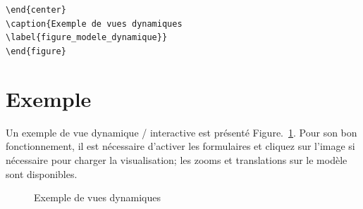 \documentclass[a4paper,12pt]{report}
\begin{document}
\verb|\end{center}   | \\
\verb|\caption{Exemple de vues dynamiques | \\
\verb|\label{figure_modele_dynamique}}  | \\
\verb|\end{figure} | \\


\section{Exemple}
Un exemple de vue dynamique / interactive est présenté Figure.~\ref{figure_modele_dynamique}. Pour son bon fonctionnement, il est nécessaire d'activer les formulaires et cliquez sur l'image si nécessaire pour charger la visualisation; les zooms et translations sur le modèle sont disponibles.

\begin{figure}[hbtp]
\begin{center}


\end{center}  
\caption{Exemple de vues dynamiques
\label{figure_modele_dynamique}} 
\end{figure}



\end{document}

